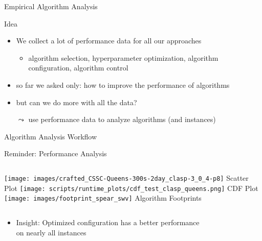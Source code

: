 \begin{frame}[c]{Empirical Algorithm Analysis}

\begin{block}{Idea}
\begin{itemize}
  \item We collect a lot of performance data for all our approaches
  \begin{itemize}
    \item algorithm selection, hyperparameter optimization, algorithm configuration, algorithm control
  \end{itemize}
  \pause
  \item so far we asked only: how to improve the performance of algorithms
  \pause
  \item but can we do more with all the data?
  \pause
  \item[$\leadsto$] use performance data to analyze algorithms (and instances)
\end{itemize}

\end{block}

\end{frame}
\begin{frame}[c]{Algorithm Analysis Workflow}

\scalebox{0.75}{

}

\end{frame}
\begin{frame}[c]{Reminder: Performance Analysis}

\begin{columns}
\texttt{[image: images/crafted\_CSSC-Queens-300s-2day\_clasp-3\_0\_4-p8]}
\centering
Scatter Plot
\texttt{[image: scripts/runtime\_plots/cdf\_test\_clasp\_queens.png]}
\centering
CDF Plot
\texttt{[image: images/footprint\_spear\_swv]}
\centering
Algorithm Footprints
\end{columns}

\pause
\bigskip

\begin{itemize}
  \item \alert{Insight:} Optimized configuration has a better performance\\ on nearly all instances
\end{itemize}

\end{frame}
